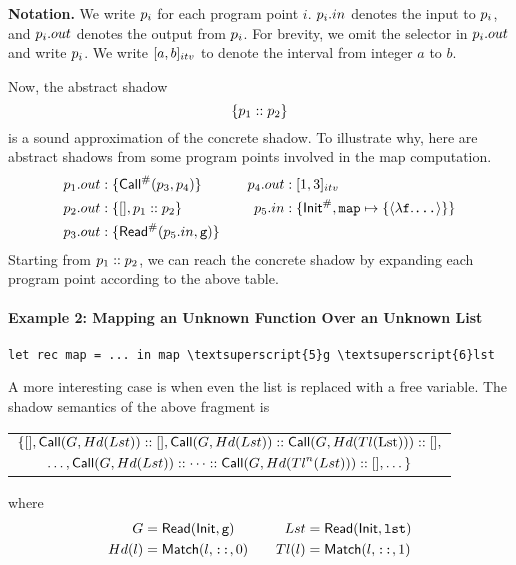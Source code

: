 \documentclass{article}
\begin{document}
\vspace{\topsep}
\noindent\textbf{Notation.}
We write $p_i$ for each program point $i$.
$p_i.{in}$ denotes the input to $p_i$, and $p_i.{out}$
denotes the output from $p_i$.
For brevity, we omit the selector in $p_i.{out}$ and write $p_i$.
We write $[a,b]_{{itv}}$ to denote the interval from integer $a$ to $b$.

\vspace{\topsep}
Now, the abstract shadow
\[\{p_1:: p_2\}\]
is a sound approximation of the concrete shadow. To illustrate why,
here are abstract shadows from some program points involved in the map computation.
\begin{align*}
  p_1.{out}:\{ & {\mathsf{Call}}^{\#}(p_3,p_4)\}                &  &  & p_4.{out}: & \;[1,3]_{{itv}}                                                             \\
  p_2.{out}:\{ & [],p_1:: p_2\}                    &  &  & p_5.{in}:  & \;\{{\mathsf{Init}}^{\#},\texttt{map}\mapsto\{\langle\lambda\texttt{f}.\texttt{...}\rangle\}\} \\
  p_3.{out}:\{ & {\mathsf{Read}}^{\#}(p_5.{in},\texttt{g})\}
\end{align*}
Starting from $p_1::p_2$, we can reach the concrete shadow by
expanding each program point according to the above table.

\paragraph{Example 2: Mapping an Unknown Function Over an Unknown List}
\begin{center}
  \begin{BVerbatim}[commandchars=\\\{\}]
let rec map = ... in map \textsuperscript{5}g \textsuperscript{6}lst
  \end{BVerbatim}
\end{center}
A more interesting case is when even the list is replaced with a free variable.
The shadow semantics of the above fragment is
\begin{center}
  \begin{tabular}{c}
    $\{[],\mathsf{Call}({G},{Hd}({Lst}))::[],\mathsf{Call}({G},{Hd}({Lst}))::\mathsf{Call}({G},{Hd}({Tl}(\text{Lst})))::[],$ \\
    [4pt]
    $\dots,\mathsf{Call}({G},{Hd}({Lst}))::\cdots::\mathsf{Call}({G},{Hd}({Tl}^{n}({Lst})))::[],\dots\}$
  \end{tabular}
\end{center}
where
\begin{align*}
  {G} & =\mathsf{Read}(\mathsf{Init},\texttt{g})       &  &  & {Lst} & =\mathsf{Read}(\mathsf{Init},\texttt{lst})     \\
  {Hd}(l)       & =\textsf{Match}(l,\texttt{::},0) &  &  & {Tl}(l)         & =\textsf{Match}(l,\texttt{::},1)
\end{align*}
\end{document}
